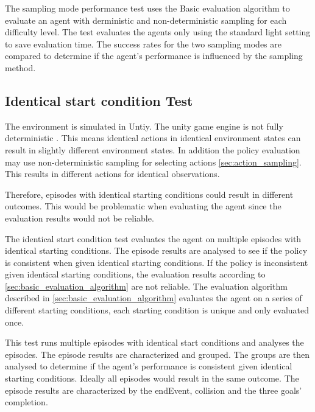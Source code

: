 The sampling mode performance test uses the Basic evaluation algorithm to evaluate an agent with derministic and non-deterministic sampling for each difficulty level. The test evaluates the agents only using the standard light setting to save evaluation time. The success rates for the two sampling modes are compared to determine if the agent's performance is influenced by the sampling method.






\subsection{Identical start condition Test}

The environment is simulated in Untiy. The unity game engine is not fully deterministic \autocite{unity_fixed-update}. This means identical actions in identical environment states can result in slightly different environment states. In addition the policy evaluation may use non-deterministic sampling for selecting actions \ref{sec:action_sampling}. This results in different actions for identical observations. 

Therefore, episodes with identical starting conditions could result in different outcomes. This would be problematic when evaluating the agent since the evaluation results would not be reliable.

The identical start condition test evaluates the agent on multiple episodes with identical starting conditions. The episode results are analysed to see if the policy is consistent when given identical starting conditions. If the policy is inconsistent given identical starting conditions, the evaluation results according to \ref{sec:basic_evaluation_algorithm} are not reliable. The evaluation algorithm described in \ref{sec:basic_evaluation_algorithm} evaluates the agent on a series of different starting conditions, each starting condition is unique and only evaluated once.

This test runs multiple episodes with identical start conditions and analyses the episodes. The episode results are characterized and grouped. The groups are then analysed to determine if the agent's performance is consistent given identical starting conditions. Ideally all episodes would result in the same outcome.
The episode results are characterized by the endEvent, collision and the three goals' completion.



